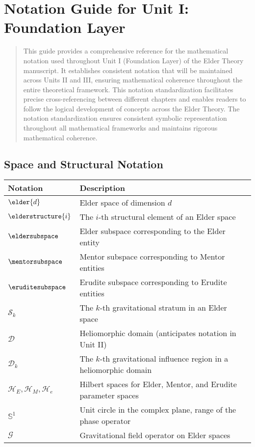 \chapter*{Notation Guide for Unit I: Foundation Layer}

\begin{abstract}
This guide provides a comprehensive reference for the mathematical notation used throughout Unit I (Foundation Layer) of the Elder Theory manuscript. It establishes consistent notation that will be maintained across Units II and III, ensuring mathematical coherence throughout the entire theoretical framework. This notation standardization facilitates precise cross-referencing between different chapters and enables readers to follow the logical development of concepts across the Elder Theory. The notation standardization ensures consistent symbolic representation throughout all mathematical frameworks and maintains rigorous mathematical coherence.
\end{abstract}

\section*{Space and Structural Notation}

\begin{tabular}{p{}p{}}
\textbf{Notation} & \textbf{Description} \\
\hline
$\elder{d}$ & Elder space of dimension $d$ \\
$\elderstructure{i}$ & The $i$-th structural element of an Elder space \\
$\eldersubspace$ & Elder subspace corresponding to the Elder entity \\
$\mentorsubspace$ & Mentor subspace corresponding to Mentor entities \\
$\eruditesubspace$ & Erudite subspace corresponding to Erudite entities \\
$\mathcal{S}_k$ & The $k$-th gravitational stratum in an Elder space \\
$\mathcal{D}$ & Heliomorphic domain (anticipates notation in Unit II) \\
$\mathcal{D}_k$ & The $k$-th gravitational influence region in a heliomorphic domain \\
$\mathcal{H}_E, \mathcal{H}_M, \mathcal{H}_e$ & Hilbert spaces for Elder, Mentor, and Erudite parameter spaces \\
$\mathbb{S}^1$ & Unit circle in the complex plane, range of the phase operator \\
$\mathcal{G}$ & Gravitational field operator on Elder spaces \\
\hline
\end{tabular}


